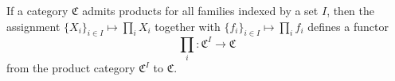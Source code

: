 If a category $\mathfrak{C}$ admits products for all families indexed by a set $I$, then the assignment $\{X_i\}_{i \in I} \mapsto \prod_i X_i$ together with $\{f_i\}_{i \in I} \mapsto \prod_i f_i$ defines a functor
$$
\prod_i : \mathfrak{C}^I \to \mathfrak{C}
$$
from the product category $\mathfrak{C}^I$ to $\mathfrak{C}$.
